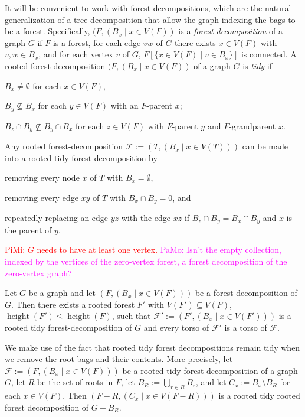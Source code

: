 \documentclass{patmorin}
\renewcommand{\le}{\leqslant}
\newcommand{\pat}[1]{\noindent\textcolor{Magenta}{PaMo: #1}}
\newcommand{\piotr}[1]{\noindent\textcolor{red}{PiMi: #1}}
\newcommand{\defin}[1]{\emph{\textcolor{brightmaroon}{#1}}}
\DeclareMathOperator{\height}{height}
\begin{document}
  It will be convenient to work with forest-decompositions, which are the natural generalization of a tree-decomposition that allow the graph indexing the bags to be a forest.  Specifically, $(F,(B_x\mid x\in V(F))$ is a \defin{forest-decomposition} of a graph $G$ if $F$ is a forest, for each edge $vw$ of $G$ there exists $x\in V(F)$ with $v,w\in B_x$, and for each vertex $v$ of $G$, $F[\{x\in V(F)\mid v\in B_x\}]$ is connected.  A rooted forest-decomposition $(F,(B_x\mid x\in V(F))$ of a graph $G$ is \defin{tidy} if
  \begin{enumerate*}[label=(\arabic*)]
  \item $B_x\neq\emptyset$ for each $x\in V(F)$,
  \item $B_y\not\subseteq B_x$ for each $y\in V(F)$ with an $F$-parent $x$;
  \item $B_z \cap B_y \not\subseteq B_y\cap B_x$ for each $z\in V(F)$ with $F$-parent $y$ and $F$-grandparent $x$.
  \end{enumerate*}
  Any rooted forest-decomposition $\mathcal{F}:=(T,(B_x\mid x\in V(T)))$ can be made into a rooted tidy forest-decomposition by
  \begin{enumerate*}[label=(\arabic*)]
  \item removing every node $x$ of $T$ with $B_x=\emptyset$,
  \item removing every edge $xy$ of $T$ with $B_x\cap B_y=0$, and
  \item repeatedly replacing an edge $yz$ with the edge $xz$ if $B_z\cap B_y=B_x\cap B_y$ and $x$ is the parent of $y$.
  \end{enumerate*}
\piotr{$G$ needs to have at least one vertex.}  \pat{Isn't the empty collection, indexed by the vertices of the zero-vertex forest, a forest decomposition of the zero-vertex graph?}
  \begin{obs}\label{tidy_forest}
    Let $G$ be a graph and let $(F,(B_x\mid x\in V(F)))$ be a forest-decomposition of $G$. Then there exists a rooted forest $F'$ with $V(F')\subseteq V(F)$, $\height(F')\le\height(F)$, such that $\mathcal{F}':=(F',(B_x\mid x\in V(F')))$ is a rooted tidy forest-decomposition of $G$ and every torso of $\mathcal{F}'$ is a torso of $\mathcal{F}$.
  \end{obs}
  We make use of the fact that rooted tidy forest decompositions remain tidy when we remove the root bags and their contents.  More precisely, let $\mathcal{F}:=(F,(B_x\mid x\in V(F)))$ be a rooted tidy forest decomposition of a graph $G$, let $R$ be the set of roots in $F$, let $B_R:=\bigcup_{r\in R}B_r$, and let $C_x:=B_x\setminus B_R$ for each $x\in V(F)$.  Then $(F-R,(C_x\mid x\in V(F-R)))$ is a rooted tidy rooted forest decomposition of $G-B_R$.
\end{document}
